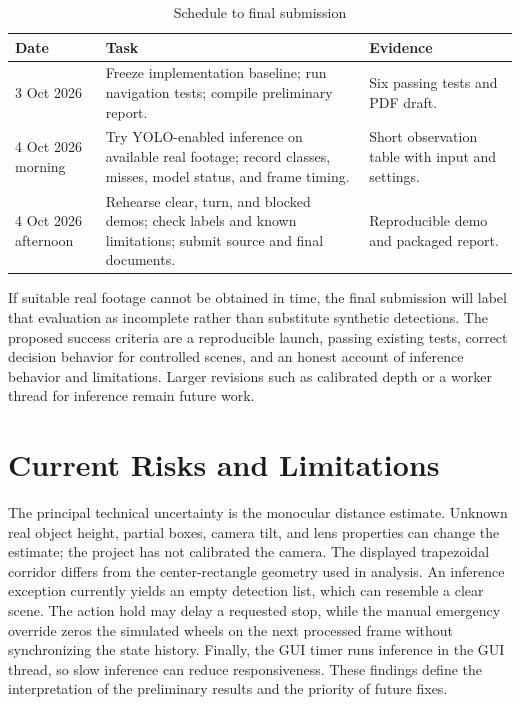 \documentclass[conference,10pt]{IEEEtran}
\begin{document}
\begin{table}[!t]
\caption{Schedule to final submission}
\label{tab:timeline}
\centering
\footnotesize
\setlength{\tabcolsep}{3pt}
\begin{tabular}{|p{}|p{}|p{}|}
\hline
\textbf{Date} & \textbf{Task} & \textbf{Evidence}\\ \hline
3 Oct 2026 & Freeze implementation baseline; run navigation tests; compile preliminary report. & Six passing tests and PDF draft.\\ \hline
4 Oct 2026 morning & Try YOLO-enabled inference on available real footage; record classes, misses, model status, and frame timing. & Short observation table with input and settings.\\ \hline
4 Oct 2026 afternoon & Rehearse clear, turn, and blocked demos; check labels and known limitations; submit source and final documents. & Reproducible demo and packaged report.\\ \hline
\end{tabular}
\end{table}

If suitable real footage cannot be obtained in time, the final submission will label that evaluation as incomplete rather than substitute synthetic detections. The proposed success criteria are a reproducible launch, passing existing tests, correct decision behavior for controlled scenes, and an honest account of inference behavior and limitations. Larger revisions such as calibrated depth or a worker thread for inference remain future work.

\section{Current Risks and Limitations}
The principal technical uncertainty is the monocular distance estimate. Unknown real object height, partial boxes, camera tilt, and lens properties can change the estimate; the project has not calibrated the camera. The displayed trapezoidal corridor differs from the center-rectangle geometry used in analysis. An inference exception currently yields an empty detection list, which can resemble a clear scene. The action hold may delay a requested stop, while the manual emergency override zeros the simulated wheels on the next processed frame without synchronizing the state history. Finally, the GUI timer runs inference in the GUI thread, so slow inference can reduce responsiveness. These findings define the interpretation of the preliminary results and the priority of future fixes.
\end{document}
